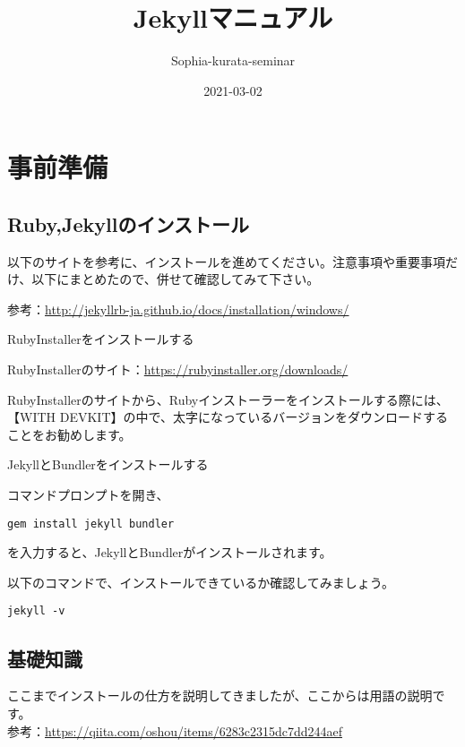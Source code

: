 \documentclass[
]{book}
\title{Jekyllマニュアル}
\author{Sophia-kurata-seminar}
\date{2021-03-02}
\begin{document}
\maketitle

{
\setcounter{tocdepth}{1}
\tableofcontents
}
\hypertarget{ux4e8bux524dux6e96ux5099}{%
\chapter*{事前準備}\label{ux4e8bux524dux6e96ux5099}}

\hypertarget{rubyjekyllux306eux30a4ux30f3ux30b9ux30c8ux30fcux30eb}{%
\section{Ruby,Jekyllのインストール}\label{rubyjekyllux306eux30a4ux30f3ux30b9ux30c8ux30fcux30eb}}

以下のサイトを参考に、インストールを進めてください。注意事項や重要事項だけ、以下にまとめたので、併せて確認してみて下さい。

参考：\url{http://jekyllrb-ja.github.io/docs/installation/windows/}

RubyInstallerをインストールする

RubyInstallerのサイト：\url{https://rubyinstaller.org/downloads/}

RubyInstallerのサイトから、Rubyインストーラーをインストールする際には、【WITH DEVKIT】の中で、太字になっているバージョンをダウンロードすることをお勧めします。

JekyllとBundlerをインストールする

コマンドプロンプトを開き、

\begin{verbatim}
gem install jekyll bundler
\end{verbatim}

を入力すると、JekyllとBundlerがインストールされます。

以下のコマンドで、インストールできているか確認してみましょう。

\begin{verbatim}
jekyll -v
\end{verbatim}

\hypertarget{ux57faux790eux77e5ux8b58}{%
\section{基礎知識}\label{ux57faux790eux77e5ux8b58}}

ここまでインストールの仕方を説明してきましたが、ここからは用語の説明です。\\
参考：\url{https://qiita.com/oshou/items/6283c2315dc7dd244aef}
\end{document}
